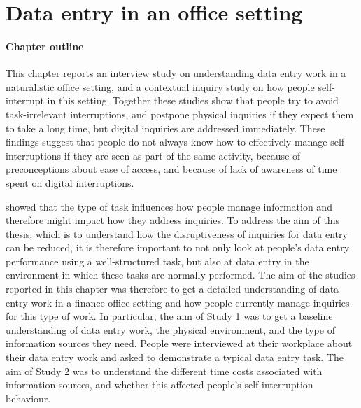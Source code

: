 \chapter{Data entry in an office setting}\label{ch:Study1}
\begin{mynote}
\subsubsection{Chapter outline}

This chapter reports an interview study on understanding data entry work in a naturalistic office setting, and a contextual inquiry study on how people self-interrupt in this setting. Together these studies show that people try to avoid task-irrelevant interruptions, and postpone physical inquiries if they expect them to take a long time, but digital inquiries are addressed immediately. These findings suggest that people do not always know how to effectively manage self-interruptions if they are seen as part of the same activity, because of preconceptions about ease of access, and because of lack of awareness of time spent on digital interruptions.

\end{mynote}
\citet{Bondarenko2005} showed that the type of task influences how people manage information and therefore might impact how they address inquiries. To address the aim of this thesis, which is to understand how the disruptiveness of inquiries for data entry can be reduced, it is therefore important to not only look at people's data entry performance using a well-structured task, but also at data entry in the environment in which these tasks are normally performed. The aim of the studies reported in this chapter was therefore to get a detailed understanding of data entry work in a finance office setting and how people currently manage inquiries for this type of work. In particular, the aim of Study 1 was to get a baseline understanding of data entry work, the physical environment, and the type of information sources they need. People were interviewed at their workplace about their data entry work and asked to demonstrate a typical data entry task. The aim of Study 2 was to understand the different time costs associated with information sources, and whether this affected people's self-interruption behaviour. %

